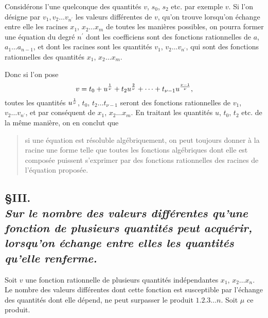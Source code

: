 \documentclass[oneside, 12 pt, leqno]{memoir}
\let\oldfrac\frac
\def\frac#1#2{\mathchoice{\text{\scalebox{.83}{${\oldfrac{#1}{#2}}$}}}{\text{\scalebox{.83}{${\displaystyle\oldfrac{#1}{#2}}$}}}{\genfrac{}{}{}{2}{#1}{#2}}{\genfrac{}{}{}{3}{#1}{#2}}}
\begin{document}
Considérons l'une quelconque des quantités \(v\), \(s_0\), \(s_2\) etc. par exemple \(v\). Si l'on désigne par \(v_1, v_2 \dots v_{n^{\prime}}\) les valeurs différentes de \(v\), qu'on trouve lorsqu'on échange entre elle les racines \(x_1\), \(x_2 \dots x_m\) de toutes les manières possibles, on pourra former une équation du degré \(n^{\prime}\) dont les coefficiens sont des fonctions rationnelles de \(a\), \(a_1 \dots a_{n-1}\), et dont les racines sont les quantités \(v_1\), \(v_2 \dots v_{n^{\prime}}\), qui sont des fonctions rationnelles des quantités \(x_1\), \(x_2 \dots x_m\).

Donc si l'on pose
\[v=t_0+u^{\frac{1}{\nu}}+t_2 u^{\frac{2}{\nu}}+\dots+t_{\nu-1} u^{\frac{\nu-1}{\nu}},\]
toutes les quantités \(u^{\frac{1}{\nu}}\), \(t_0\), \(t_2 \dots t_{\nu-1}\) seront des fonctions rationnelles de \(v_1\), \(v_2 \dots v_{n^{\prime}}\), et par conséquent de \(x_1\), \(x_2 \dots x_m\). En traitant les quantités \(u\), \(t_0\), \(t_2\) etc. de la même manière, on en conclut que
\begin{quote}
si une équation est résoluble algébriquement, on peut toujours donner à la racine une forme telle que toutes les fonctions algébriques dont elle est composée puissent s'exprimer par des fonctions rationnelles des racines de l'équation proposée.
\end{quote}

\subsection*{\S III.\\
{\scriptsize \textit{Sur le nombre des valeurs différentes qu'une fonction de plusieurs quantités peut acquérir, lorsqu'on échange entre elles les quantités qu'elle renferme.}}}

Soit \(v\) une fonction rationnelle de plusieurs quantités indépendantes \(x_1\), \(x_2 \dots x_n\). Le nombre des valeurs différentes dont cette fonction est susceptible par l'échange des quantités dont elle dépend, ne peut surpasser le produit \(1.2.3 \dots n\). Soit \(\mu\) ce produit.
\end{document}
